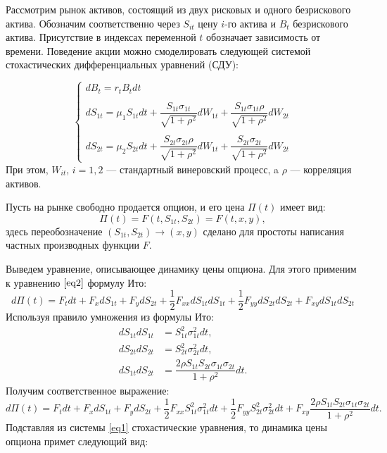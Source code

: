 \documentclass[a4paper, 12pt]{extreport}
\numberwithin{equation}{section}
\begin{document}
	
	Рассмотрим рынок активов, состоящий из двух рисковых и одного безрискового актива. Обозначим соответственно через $S_{it}$ цену $i$-го актива и $B_t$ безрискового актива. Присутствие в индексах переменной $t$ обозначает зависимость от времени. Поведение акции можно смоделировать следующей системой стохастических дифференциальных уравнений (СДУ):
	
	\begin{equation} \label{eq1}
		\begin{cases}
			dB_t = r_t B_tdt
			\\
			\\
			dS_{1t} = \mu_1 S_{1t} dt + \dfrac{S_{1t} \sigma_{1t}}{\sqrt{1+\rho^2}} dW_{1t} +  \dfrac{S_{1t} \sigma_{1t} \rho}{\sqrt{1+\rho^2}} dW_{2t}
			\\
			\\
			dS_{2t} = \mu_2 S_{2t} dt + \dfrac{S_{2t} \sigma_{2t}\rho}{\sqrt{1+\rho^2}} dW_{1t} +  \dfrac{S_{2t} \sigma_{2t}}{\sqrt{1+\rho^2}} dW_{2t}
		\end{cases}
	\end{equation}
	При этом, $W_{it}$, $i=1,2$ --- стандартный винеровский процесс, a $\rho$ --- корреляция активов. 
	
	
	Пусть на рынке свободно продается опцион, и его цена $\Pi(t)$ имеет вид:
	\begin{equation} \label{eq2}
		\Pi(t)=F(t,S_{1t},S_{2t})=F(t,x,y),
	\end{equation}
	здесь переобозначение $(S_{1t},S_{2t}) \to (x,y)$ сделано для простоты написания частных производных функции $F$.
	
	Выведем уравнение, описывающее динамику цены опциона. Для этого применим к уравнению $\eqref{eq2}$ формулу Ито:
	\begin{equation*}
		d\Pi(t)=F_tdt+F_xdS_{1t}+F_ydS_{2t}+\frac{1}{2}F_{xx}dS_{1t}dS_{1t}+\frac{1}{2}F_{yy}dS_{2t}dS_{2t}+ F_{xy}dS_{1t}dS_{2t}
	\end{equation*}
	Используя правило умножения из формулы Ито:
		\begin{align*}
		dS_{1t}dS_{1t}&=S_{1t}^2\sigma_{1t}^2dt ,\\ 
		dS_{2t}dS_{2t}&=S_{2t}^2\sigma_{2t}^2dt ,\\ 
		dS_{1t}dS_{2t}&=\dfrac{2\rho S_{1t} S_{2t} \sigma_{1t} \sigma_{2t}}{1+\rho^2}dt .
			\end{align*}
	Получим соответственное выражение:
	\begin{equation*}
		d\Pi(t) = F_tdt+F_xdS_{1t} + F_ydS_{2t} + \frac{1}{2}F_{xx}S_{1t}^2\sigma_{1t}^2dt+\frac{1}{2}F_{yy}S_{2t}^2\sigma_{2t}^2dt+F_{xy}\dfrac{2\rho S_{1t} S_{2t} \sigma_{1t} \sigma_{2t}}{1+\rho^2}dt.
	\end{equation*}	
	Подставляя из системы \eqref{eq1} стохастические уравнения, то динамика цены опциона примет следующий вид:
	
\end{document}
